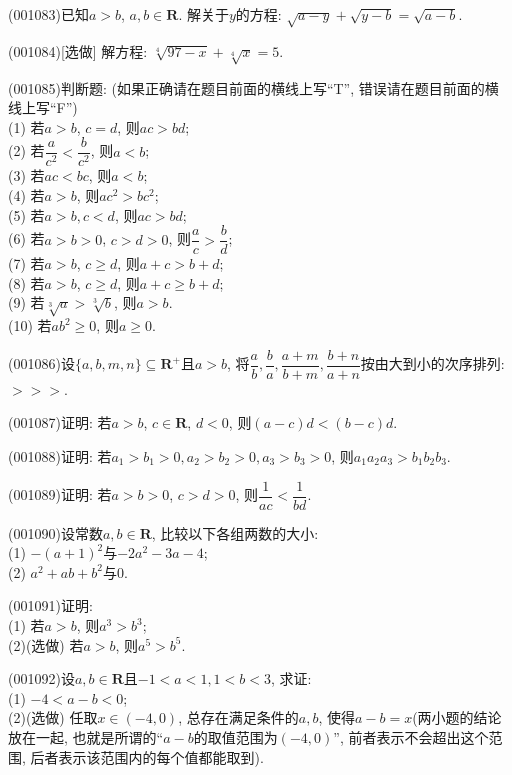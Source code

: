 \item (001083)已知$a>b$, $a,b\in \mathbf{R}$. 解关于$y$的方程: $\sqrt{a-y}+\sqrt{y-b}=\sqrt{a-b}$.
\item (001084)[选做]
解方程: $\sqrt[4]{97-x}+\sqrt[4]{x}=5$.
\item (001085)判断题: (如果正确请在题目前面的横线上写``T'', 错误请在题目前面的横线上写``F'')\\ 
(1) 若$a>b$, $c=d$, 则$ac>bd$;\\ 
(2) 若$\dfrac{a}{c^2}<\dfrac{b}{c^2}$, 则$a<b$;\\ 
(3) 若$ac<bc$, 则$a<b$;\\ 
(4) 若$a>b$, 则$ac^2>bc^2$;\\ 
(5) 若$a>b,c<d$, 则$ac>bd$;\\ 
(6) 若$a>b>0$, $c>d>0$, 则$\dfrac{a}{c}>\dfrac{b}{d}$;\\ 
(7) 若$a>b$, $c\geq d$, 则$a+c>b+d$;\\ 
(8) 若$a>b$, $c\geq d$, 则$a+c\geq b+d$;\\ 
(9) 若$\sqrt[3]{a}>\sqrt[3]{b}$, 则$a>b$.\\ 
(10) 若$ab^2\geq 0$, 则$a\geq 0$.
\item (001086)设$\{a,b,m,n\}\subseteq\mathbf{R}^+$且$a>b$, 将$\dfrac{a}{b},\dfrac{b}{a},\dfrac{a+m}{b+m},\dfrac{b+n}{a+n}$按由大到小的次序排列:\\
$>$$>$$>$.
\item (001087)证明: 若$a>b$, $c\in\mathbf{R}$, $d<0$, 则$(a-c)d<(b-c)d$.
\item (001088)证明: 若$a_1>b_1>0,a_2>b_2>0,a_3>b_3>0$, 则$a_1a_2a_3>b_1b_2b_3$.
\item (001089)证明: 若$a>b>0$, $c>d>0$, 则$\dfrac{1}{ac}<\dfrac{1}{bd}$.
\item (001090)设常数$a,b\in\mathbf{R}$, 比较以下各组两数的大小:\\ 
(1) $-(a+1)^2$与$-2a^2-3a-4$;\\ 
(2) $a^2+ab+b^2$与$0$.
\item (001091)证明:\\ 
(1) 若$a>b$, 则$a^3>b^3$;\\ 
(2)(选做) 若$a>b$, 则$a^5>b^5$.
\item (001092)设$a,b\in\mathbf{R}$且$-1<a<1,1<b<3$, 求证:\\ 
(1) $-4<a-b<0$;\\ 
(2)(选做) 任取$x\in(-4,0)$, 总存在满足条件的$a,b$, 使得$a-b=x$(两小题的结论放在一起, 也就是所谓的``$a-b$的取值范围为$(-4,0)$'', 前者表示不会超出这个范围, 后者表示该范围内的每个值都能取到).
